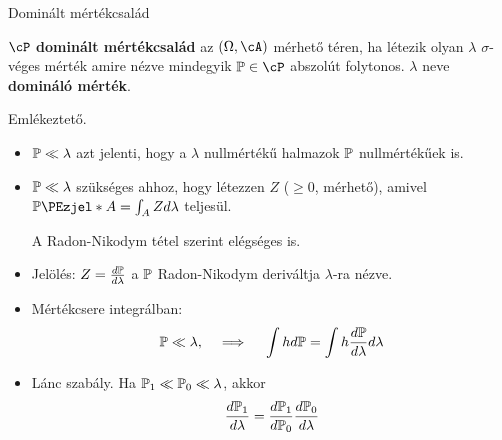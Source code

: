 \documentclass[aspectratio=169,notheorems,9pt,\option]{beamer}
\begin{document}

\begin{frame}{Dominált mértékcsalád}
  \begin{df}
    $\cP$ \textbf{dominált mértékcsalád} az $(\Omega,\cA)$ mérhető téren, 
    ha létezik olyan $\lambda$ $\sigma$-véges 
    mérték amire nézve mindegyik $\P\in\cP$ abszolút folytonos. 
    $\lambda$ neve \textbf{domináló mérték}.
  \end{df}
  \continue
  Emlékeztető.
  \begin{itemize}
    \item $\P\ll\lambda$ azt jelenti, hogy a $\lambda$ nullmértékű halmazok 
    $\P$ nullmértékűek is.
    \item $\P\ll\lambda$ szükséges ahhoz, hogy létezzen $Z$ ($\geq0$, mérhető), 
    amivel $\P{A}=\int_A Zd\lambda$ teljesül.
    
    A Radon-Nikodym tétel szerint elégséges is.
    \item Jelölés: $Z=\frac{d\P}{d\lambda}$ a $\P$ Radon-Nikodym deriváltja 
    $\lambda$-ra nézve.
    \item Mértékcsere integrálban:
    \begin{displaymath}
        \P\ll\lambda,\quad\implies\quad \int h d\P=\int h\frac{d\P}{d\lambda}d\lambda
    \end{displaymath}
    \item Lánc szabály. Ha $\P[1]\ll\P[0]\ll\lambda$, akkor
    \begin{displaymath}
      \frac{d\P[1]}{d\lambda}=\frac{d\P[1]}{d\P[0]}\frac{d\P[0]}{d\lambda}
    \end{displaymath} 
  \end{itemize}
\end{frame}
\end{document}
